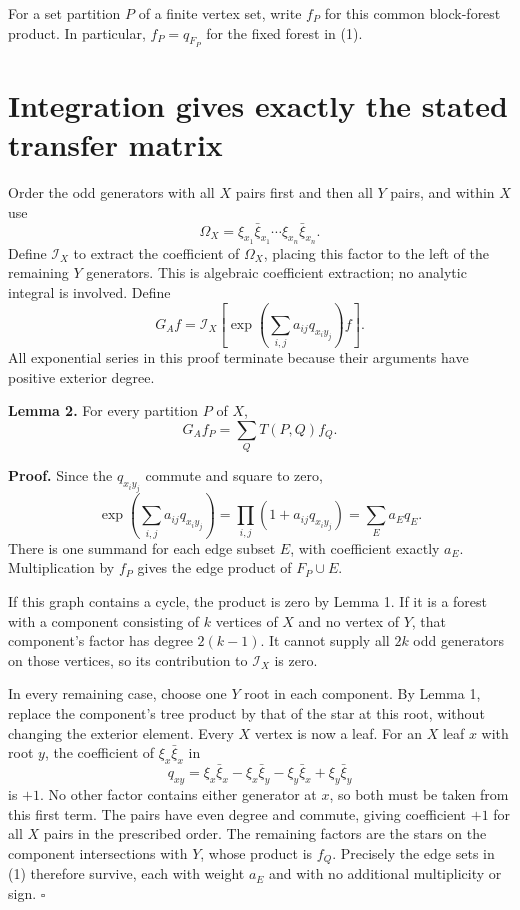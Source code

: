 \documentclass[11pt]{article}
\begin{document}
For a set partition \(P\) of a finite vertex set, write \(f_P\) for this common block-forest product. In particular, \(f_P=q_{F_P}\) for the fixed forest in (1).

\section{Integration gives exactly the stated transfer matrix}\label{integration-gives-exactly-the-stated-transfer-matrix}

Order the odd generators with all \(X\) pairs first and then all \(Y\) pairs, and within \(X\) use \[
\Omega_X=\xi_{x_1}\bar\xi_{x_1}\cdots\xi_{x_n}\bar\xi_{x_n}.
\] Define \(\mathcal I_X\) to extract the coefficient of \(\Omega_X\), placing this factor to the left of the remaining \(Y\) generators. This is algebraic coefficient extraction; no analytic integral is involved. Define \[
G_A f=\mathcal I_X\left[
 \exp\left(\sum_{i,j}a_{ij}q_{x_i y_j}\right)f
\right].
\tag{5}
\] All exponential series in this proof terminate because their arguments have positive exterior degree.

\textbf{Lemma 2.} For every partition \(P\) of \(X\), \[
G_Af_P=\sum_Q T(P,Q)f_Q.
\tag{6}
\]

\textbf{Proof.} Since the \(q_{x_i y_j}\) commute and square to zero, \[
\exp\left(\sum_{i,j}a_{ij}q_{x_i y_j}\right)
=\prod_{i,j}(1+a_{ij}q_{x_i y_j})
=\sum_E a_Eq_E.
\tag{7}
\] There is one summand for each edge subset \(E\), with coefficient exactly \(a_E\). Multiplication by \(f_P\) gives the edge product of \(F_P\cup E\).

If this graph contains a cycle, the product is zero by Lemma 1. If it is a forest with a component consisting of \(k\) vertices of \(X\) and no vertex of \(Y\), that component's factor has degree \(2(k-1)\). It cannot supply all \(2k\) odd generators on those vertices, so its contribution to \(\mathcal I_X\) is zero.

In every remaining case, choose one \(Y\) root in each component. By Lemma 1, replace the component's tree product by that of the star at this root, without changing the exterior element. Every \(X\) vertex is now a leaf. For an \(X\) leaf \(x\) with root \(y\), the coefficient of \(\xi_x\bar\xi_x\) in \[
q_{xy}=\xi_x\bar\xi_x-\xi_x\bar\xi_y
       -\xi_y\bar\xi_x+\xi_y\bar\xi_y
\] is \(+1\). No other factor contains either generator at \(x\), so both must be taken from this first term. The pairs have even degree and commute, giving coefficient \(+1\) for all \(X\) pairs in the prescribed order. The remaining factors are the stars on the component intersections with \(Y\), whose product is \(f_Q\). Precisely the edge sets in (1) therefore survive, each with weight \(a_E\) and with no additional multiplicity or sign. \(\square\)
\end{document}
